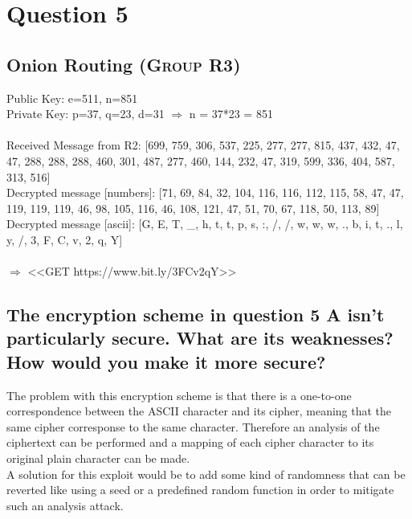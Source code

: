 \documentclass{report}
\begin{document}
	\section{Question 5}
	\startsection
		\renewcommand{\thesubsection}{\thesection.\Alph{subsection}}
		\subsection{Onion Routing (\textsc{Group} R3)}
		\startsubsection
			Public Key: e=511, n=851 \\
			Private Key: p=37, q=23, d=31 $\Rightarrow$ n = 37*23 = 851 \\
			\\
			Received Message from R2: [699, 759, 306, 537, 225, 277, 277, 815, 437, 432, 47, 47, 288, 288, 288, 460, 301, 487, 277, 460, 144, 232, 47, 319, 599, 336, 404, 587, 313, 516] \\

			\noindent Decrypted message [numbers]: [71, 69, 84, 32, 104, 116, 116, 112, 115, 58, 47, 47, 119, 119, 119, 46, 98, 105, 116, 46, 108, 121, 47, 51, 70, 67, 118, 50, 113, 89] \\
			Decrypted message [ascii]: [G, E, T, \_, h, t, t, p, s, :, /, /, w, w, w, ., b, i, t, ., l, y, /, 3, F, C, v, 2, q, Y] \\
			\\
			$\Rightarrow$ <<GET https://www.bit.ly/3FCv2qY>>
		\closesection
		\subsection{The encryption scheme in question 5 A isn’t particularly secure. What are its weaknesses? How would you make it more secure?}
		\startsubsection
			The problem with this encryption scheme is that there is a one-to-one correspondence between the ASCII character and its cipher, meaning that the same cipher corresponse to the same character. Therefore an analysis of the ciphertext can be performed and a mapping of each cipher character to its original plain character can be made. \\
			A solution for this exploit would be to add some kind of randomness that can be reverted like using a seed or a predefined random function in order to mitigate such an analysis attack.
		\closesection
	\closesection
\end{document}
